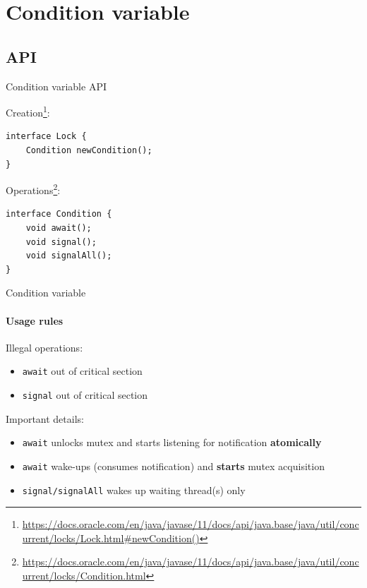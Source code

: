 
\section{Condition variable}
\subsection{API}
\showTOCSub

\begin{frame}[fragile]{Condition variable API}

Creation\footnote{\tiny\url{https://docs.oracle.com/en/java/javase/11/docs/api/java.base/java/util/concurrent/locks/Lock.html#newCondition()}}:
\begin{verbatim}
interface Lock {
    Condition newCondition();
}
\end{verbatim}

Operations\footnote{\tiny\url{https://docs.oracle.com/en/java/javase/11/docs/api/java.base/java/util/concurrent/locks/Condition.html}}:
\begin{verbatim}
interface Condition {
    void await();
    void signal();
    void signalAll();
}
\end{verbatim}
\end{frame}

\begin{frame}[fragile]{Condition variable}
\framesubtitle{Usage rules}

Illegal operations:
\begin{itemize}
    \item \texttt{await} out of critical section
    \item \texttt{signal} out of critical section
\end{itemize}

Important details:
\begin{itemize}
    \item \texttt{await} unlocks mutex and starts listening for notification \textbf{atomically}
    \item \texttt{await} wake-ups (consumes notification) and \textbf{starts} mutex acquisition
    \item \texttt{signal/signalAll} wakes up waiting thread(s) only
\end{itemize}
\end{frame}

